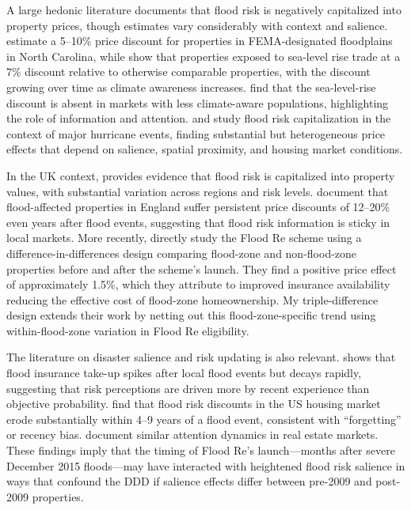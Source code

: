 \documentclass[12pt]{article}
\begin{document}
A large hedonic literature documents that flood risk is negatively capitalized into property prices, though estimates vary considerably with context and salience. \citet{bin2004flood} estimate a 5--10\% price discount for properties in FEMA-designated floodplains in North Carolina, while \citet{bernstein2019disaster} show that properties exposed to sea-level rise trade at a 7\% discount relative to otherwise comparable properties, with the discount growing over time as climate awareness increases. \citet{murfin2020climate} find that the sea-level-rise discount is absent in markets with less climate-aware populations, highlighting the role of information and attention. \citet{koster2021flood} and \citet{ortega2018rising} study flood risk capitalization in the context of major hurricane events, finding substantial but heterogeneous price effects that depend on salience, spatial proximity, and housing market conditions.

In the UK context, \citet{mayson2024flood} provides evidence that flood risk is capitalized into property values, with substantial variation across regions and risk levels. \citet{lamond2009flooding} document that flood-affected properties in England suffer persistent price discounts of 12--20\% even years after flood events, suggesting that flood risk information is sticky in local markets. More recently, \citet{garbarino2024effect} directly study the Flood Re scheme using a difference-in-differences design comparing flood-zone and non-flood-zone properties before and after the scheme's launch. They find a positive price effect of approximately 1.5\%, which they attribute to improved insurance availability reducing the effective cost of flood-zone homeownership. My triple-difference design extends their work by netting out this flood-zone-specific trend using within-flood-zone variation in Flood Re eligibility.

The literature on disaster salience and risk updating is also relevant. \citet{gallagher2014learning} shows that flood insurance take-up spikes after local flood events but decays rapidly, suggesting that risk perceptions are driven more by recent experience than objective probability. \citet{atreya2013forgotten} find that flood risk discounts in the US housing market erode substantially within 4--9 years of a flood event, consistent with ``forgetting'' or recency bias. \citet{gibson2019climate} document similar attention dynamics in real estate markets. These findings imply that the timing of Flood Re's launch---months after severe December 2015 floods---may have interacted with heightened flood risk salience in ways that confound the DDD if salience effects differ between pre-2009 and post-2009 properties.
\end{document}
